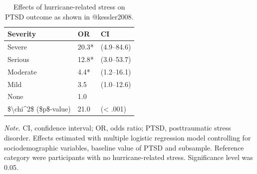 \documentclass[
]{krantz}
\begin{document}
\begin{table}

\caption{\label{tab:tabResults}Effects of hurricane-related stress on PTSD outcome as shown in @kessler2008.}
\centering
\begin{tabular}[t]{l|l|l}
\hline
Severity & OR & CI\\
\hline
Severe & 20.3* & (4.9–84.6)\\
\hline
Serious & 12.8* & (3.0–53.7)\\
\hline
Moderate & 4.4* & (1.2–16.1)\\
\hline
Mild & 3.5 & (1.0–12.6)\\
\hline
None & 1.0 & \\
\hline
\$\textbackslash{}chi\textasciicircum{}2\$ (\$p\$-value) & 21.0 & (< .001)\\
\hline
\end{tabular}
\end{table}

\emph{Note.} CI, confidence interval; OR, odds ratio; PTSD, posttraumatic stress disorder. Effects estimated with multiple logistic regression model controlling for sociodemographic variables, baseline value of PTSD and subsample. Reference category were participants with no hurricane-related stress. Significance level was 0.05.
\end{document}
